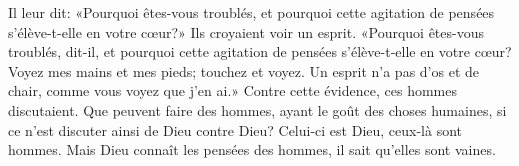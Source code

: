 Il leur dit: «Pourquoi êtes-vous troublés,
	et pourquoi cette agitation de pensées s’élève-t-elle en votre cœur?»
	Ils croyaient voir un esprit.
«Pourquoi êtes-vous troublés, dit-il,
	et pourquoi cette agitation de pensées s’élève-t-elle en votre cœur?
	Voyez mes mains et mes pieds; touchez et voyez.
Un esprit n’a pas d’os et de chair,
	comme vous voyez que j’en ai.»
Contre cette évidence, ces hommes discutaient.
Que peuvent faire des hommes, ayant le goût des choses humaines,
	si ce n’est discuter ainsi de Dieu contre Dieu?
	Celui-ci est Dieu, ceux-là sont hommes.
Mais Dieu connaît les pensées des hommes,
	il sait qu’elles sont vaines.
